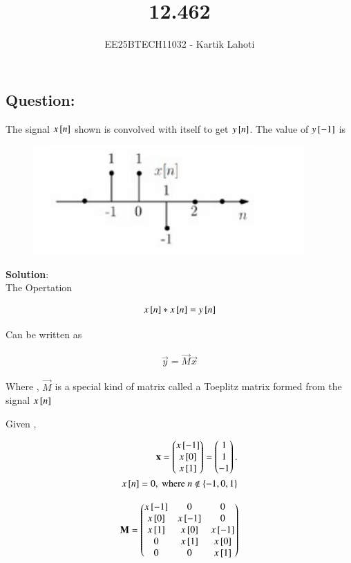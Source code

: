 \documentclass[journal]{IEEEtran}
\numberwithin{equation}{enumi}
\numberwithin{figure}{enumi}
\begin{document}

\vspace{3cm}

\title{12.462}
\author{EE25BTECH11032 - Kartik Lahoti}
\maketitle

\subsection*{Question: } 
The signal $x{}\left[n\right]$ shown  is convolved with itself to get $y{}\left[n\right]$. The value of $y{}\left[-1\right]$ is 
\begin{figure}[H]
    \centering
    \includegraphics[width=0.5\columnwidth]{figs/q1.png}
    \caption*{}
    \label{fig:placeholder}
\end{figure}


\textbf{Solution}:\\

The Opertation 

\begin{align}
    x{}\left[n\right] * x{}\left[n\right] = y{}\left[n\right] 
\end{align}

Can be written as 

\begin{align}
    \vec{y} = \vec{M}\vec{x}
\end{align}

Where , $\vec{M}$ is a special kind of matrix called a Toeplitz matrix formed from the signal $x{}\left[n\right]$

Given , 

\begin{align}
    \mathbf{x} = \begin{pmatrix}x{}\left[-1\right]\\x{}\left[0\right]\\x{}\left[1\right]\end{pmatrix} = \begin{pmatrix}1\\1\\-1\end{pmatrix}. \\x{}\left[n\right] = 0 , \text{ where } n \notin \left\{-1,0,1\right\}
\end{align}

\begin{align}
    \mathbf{M} = \begin{pmatrix}x{}\left[-1\right]&0&0\\x{}\left[0\right]&x{}\left[-1\right]&0\\x{}\left[1\right]&x{}\left[0\right]&x{}\left[-1\right]\\0&x{}\left[1\right]&x{}\left[0\right]\\0&0&x{}\left[1\right]\end{pmatrix}
\end{align}
\end{document}

